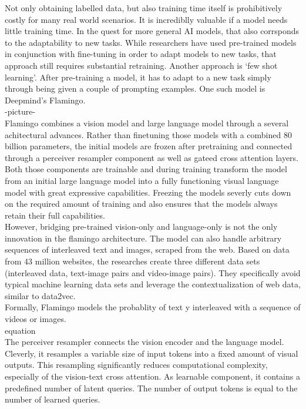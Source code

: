 \documentclass[
]{krantz}
\begin{document}
Not only obtaining labelled data, but also training time itself is prohibitively costly for many real world scenarios. It is incrediblly valuable
if a model needs little training time. In the quest for more general AI models, that also corrsponds to the adaptability to new tasks. While researchers have
used pre-trained models in conjunction with fine-tuning in order to adapt models to new tasks, that approach still requires substantial retraining. Another
approach is `few shot learning'. After pre-training a model, it has to adapt to a new task simply through being given a couple of prompting examples.
One such model is Deepmind's Flamingo.\\
-picture-\\
Flamingo combines a vision model and large language model through a several achitectural advances. Rather than finetuning those models with a
combined 80 billion parameters, the initial models are frozen after pretraining and connected through a perceiver resampler component as well as gateed
cross attention layers. Both those components are trainable and during training transform the model from an initial large language model into a fully
functioning visual language model with great expressive capabilities. Freezing the models severly cuts down on the required amount of training and also
ensures that the models always retain their full capabilities.\\
However, bridging pre-trained vision-only and language-only is not the only innovation in the flamingo architecture. The model can also handle arbitrary
sequences of interleaved text and images, scraped from the web. Based on data from 43 million websites, the researches create three different data sets
(interleaved data, text-image pairs and video-image pairs). They specifically avoid typical machine learning data sets and leverage the contextualization of
web data, similar to data2vec.\\
Formally, Flamingo models the probablity of text y interleaved with a sequence of videos or images.\\
equation\\
The perceiver resampler connects the vision encoder and the language model. Cleverly, it resamples a variable size of input tokens into a fixed amount of visual outputs. This resampling significantly reduces computational complexity, especially of the vision-text cross attention. As learnable component, it contains a predefined number of latent queries. The number of output tokens is equal to the number of learned queries.
\end{document}
